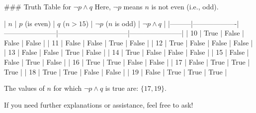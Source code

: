 ### Truth Table for \( \neg p \wedge q \)
Here, \( \neg p \) means \( n \) is not even (i.e., odd).

| \( n \) | \( p \) (is even) | \( q \) (\( n > 15 \)) | \( \neg p \) (\( n \) is odd) | \( \neg p \wedge q \) |
|---------|-------------------|-----------------------|------------------------------|-----------------------|
| 10      | True              | False                 | False                        | False                 |
| 11      | False             | False                 | True                         | False                 |
| 12      | True              | False                 | False                        | False                 |
| 13      | False             | False                 | True                         | False                 |
| 14      | True              | False                 | False                        | False                 |
| 15      | False             | False                 | True                         | False                 |
| 16      | True              | True                  | False                        | False                 |
| 17      | False             | True                  | True                         | True                  |
| 18      | True              | True                  | False                        | False                 |
| 19      | False             | True                  | True                         | True                  |

The values of \( n \) for which \( \neg p \wedge q \) is true are: \( \{17, 19\} \).

If you need further explanations or assistance, feel free to ask!